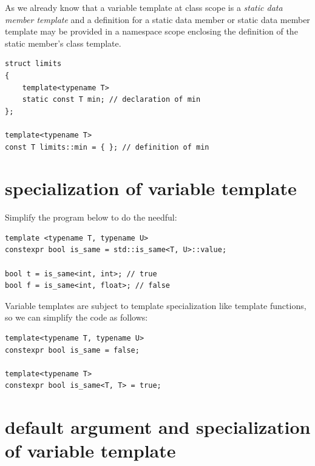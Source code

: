 \begin{Answer}[ref=ex05]
As we already know that a variable template at class scope is a \emph{static data member template} and a definition for a static data member or static data member template may be provided in a namespace scope enclosing the definition of the static member's class template. 
\begin{lstlisting}
struct limits 
{
    template<typename T>
    static const T min; // declaration of min
};

template<typename T>
const T limits::min = { }; // definition of min
\end{lstlisting}
\end{Answer}



\section{specialization of variable template}

\begin{Exercise}[title={specialization of variable template}, difficulty=3, label=ex06]
Simplify the program below to do the needful:

\begin{lstlisting}
template <typename T, typename U>
constexpr bool is_same = std::is_same<T, U>::value;

bool t = is_same<int, int>; // true
bool f = is_same<int, float>; // false
\end{lstlisting}

\end{Exercise}


\begin{Answer}[ref=ex06]
Variable templates are subject to template specialization like template functions, so we can simplify the code as follows:

\begin{lstlisting}
template<typename T, typename U>
constexpr bool is_same = false;

template<typename T>
constexpr bool is_same<T, T> = true;
\end{lstlisting}
\end{Answer}




\section{default argument and specialization of variable template}

